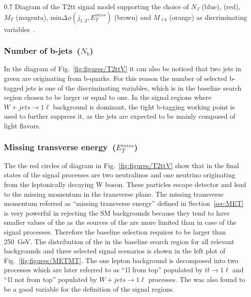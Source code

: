                  {0.7}       %
                 { Diagram of the T2tt signal model supporting the choice of $N_{J}$ (blue), \MET (red),  $M_{T}$ (magenta), min$\Delta \phi (j_{1,2}, E_{T}^{miss})$ (brown) and $M_{\ell b}$ (orange) as discriminating variables~\cite{CMS:2016vew}. }

\subsubsection{Number of b-jets~($N_{b}$)}

In the diagram of Fig.~\ref{fig:figures/T2ttV} it can also be noticed that two jets in green are originating from b-quarks. For this reason the number of selected b-tagged jets is one of the discriminating variables, which is in the baseline search region  chosen to be larger or equal to one. In the signal regions where $W+jets \to 1\ell$  background is dominant, the tight b-tagging working point is used to further suppress it, as the jets are expected to be mainly composed of light flavors.

\subsubsection{Missing transverse energy~($E_{T}^{miss}$)}

The the red circles of diagram in Fig.~\ref{fig:figures/T2ttV} show that in the final states of the signal processes are two neutralinos and one neutrino originating from the leptonically decaying W boson. These particles escape detector and lead to the missing momentum in the transverse plane. The missing transverse momentum referred as ``missing transverse energy'' defined in Section~\ref{sec:MET} is very powerful in rejecting the SM backgrounds because they tend to have smaller values of the \MET as the sources of the \MET are more limited than in case of the signal processes. Therefore the baseline selection requires \MET to be larger than 250~GeV. The distribution of the \MET in the baseline search region for all relevant backgrounds and three selected signal scenarios is shown in the left plot of Fig.~\ref{fig:figures/METMT}. The one lepton background is decomposed into two processes which are later referred to as ``1l from top'' populated by $t \bar{t} \to 1\ell$ and ``1l not from top'' populated by $W+jets \to 1\ell$  processes. The \MET was also found to be a good variable for the definition of the signal regions.

